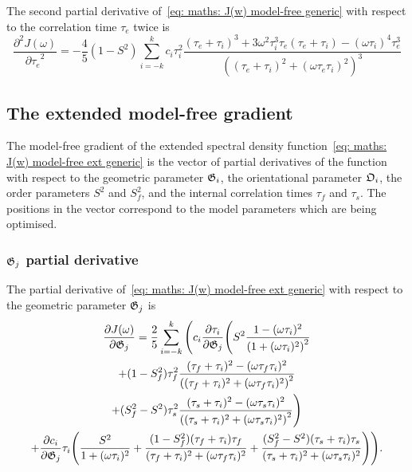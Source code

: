 The second partial derivative of~\eqref{eq: maths: J(w) model-free generic} with respect to the correlation time $\tau_e$ twice is
\begin{equation}
    \frac{\partial^2 J(\omega)}{{\partial \tau_e}^2} = -\frac{4}{5} (1 - S^2) \sum_{i=-k}^k c_i \tau_i^2
        \frac{(\tau_e + \tau_i)^3  +  3 \omega^2 \tau_i^3 \tau_e (\tau_e + \tau_i)  -  (\omega \tau_i)^4 \tau_e^3}
            {\left((\tau_e + \tau_i)^2 + (\omega \tau_e \tau_i)^2 \right)^3}
\end{equation}





\newpage
\subsection{The extended model-free gradient}

The model-free gradient of the extended spectral density function~\eqref{eq: maths: J(w) model-free ext generic} is the vector of partial derivatives of the function with respect to the geometric parameter $\mathfrak{G}_i$, the orientational parameter $\mathfrak{O}_i$, the order parameters $S^2$ and $S^2_f$, and the internal correlation times $\tau_f$ and $\tau_s$.  The positions in the vector correspond to the model parameters which are being optimised.



\subsubsection{$\mathfrak{G}_j$ partial derivative}

The partial derivative of~\eqref{eq: maths: J(w) model-free ext generic} with respect to the geometric parameter $\mathfrak{G}_j$ is
\begin{multline}
    \frac{\partial J(\omega)}{\partial \mathfrak{G}_j} = \frac{2}{5} \sum_{i=-k}^k \Bigg(
        c_i \frac{\partial \tau_i}{\partial \mathfrak{G}_j} \Bigg(
            S^2 \frac{1 - (\omega \tau_i)^2}{\left(1 + (\omega \tau_i)^2 \right)^2} \\
            + (1 - S^2_f) \tau_f^2 \frac{(\tau_f + \tau_i)^2 - (\omega \tau_f \tau_i)^2}{\left((\tau_f + \tau_i)^2 + (\omega \tau_f \tau_i)^2 \right)^2} \\
            + (S^2_f - S^2) \tau_s^2 \frac{(\tau_s + \tau_i)^2 - (\omega \tau_s \tau_i)^2}{\left((\tau_s + \tau_i)^2 + (\omega \tau_s \tau_i)^2 \right)^2}
        \Bigg) \\
        +  \frac{\partial c_i}{\partial \mathfrak{G}_j} \tau_i \Bigg(
            \frac{S^2}{1 + (\omega \tau_i)^2}
            + \frac{(1 - S^2_f)(\tau_f + \tau_i)\tau_f}{(\tau_f + \tau_i)^2 + (\omega \tau_f \tau_i)^2}
            + \frac{(S^2_f - S^2)(\tau_s + \tau_i)\tau_s}{(\tau_s + \tau_i)^2 + (\omega \tau_s \tau_i)^2}
        \Bigg)
    \Bigg).
\end{multline}



